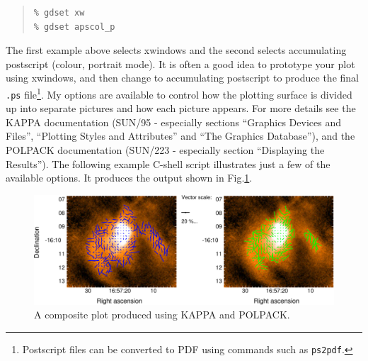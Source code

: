 \documentclass[twoside,11pt]{starlink}
\begin{document}
\begin{quote}
\begin{verbatim}
% gdset xw
% gdset apscol_p
\end{verbatim}
\end{quote}

The first example above selects xwindows and the second selects
accumulating postscript (colour, portrait mode). It is often a good idea
to prototype your plot using xwindows, and then change to accumulating
postscript to produce the final \texttt{.ps} file\footnote{Postscript
files can be converted to PDF using commands such as \texttt{ps2pdf}.}.
My options are available to control how the plotting surface is divided
up into separate pictures and how each picture appears. For more details
see the KAPPA documentation (SUN/95 - especially sections ``Graphics
Devices and Files'', ``Plotting Styles and Attributes'' and ``The
Graphics Database''), and the POLPACK documentation (SUN/223 - especially
section ``Displaying the Results''). The following example C-shell script
illustrates just a few of the available options. It produces the output
shown in Fig.\ref{fig:myplot}.

\begin{figure}
\includegraphics[width=\columnwidth]{myplot}
\caption{A composite plot produced using KAPPA and POLPACK.}
\label{fig:myplot}
\end{figure}
\end{document}
